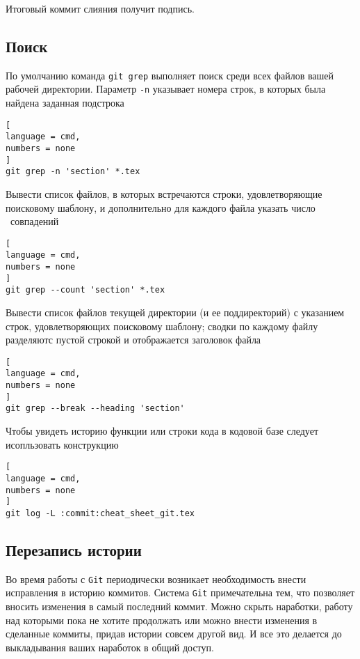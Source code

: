 \documentclass[%
	11pt,
	a4paper,
	utf8,
		]{article}
\begin{document}
Итоговый коммит слияния получит подпись.


\subsection{Поиск}

По умолчанию команда \texttt{git grep} выполняет поиск среди всех файлов вашей рабочей директории. Параметр \texttt{-n} указывает номера строк, в которых была найдена заданная подстрока

\begin{lstlisting}[
language = cmd,
numbers = none
]
git grep -n 'section' *.tex
\end{lstlisting}

Вывести список файлов, в которых встречаются строки, удовлетворяющие поисковому шаблону, и дополнительно для каждого файла указать число  совпадений

\begin{lstlisting}[
language = cmd,
numbers = none
]
git grep --count 'section' *.tex
\end{lstlisting}

Вывести список файлов текущей директории (и ее поддиректорий) с указанием строк, удовлетворяющих поисковому шаблону; сводки по каждому файлу разделяютс пустой строкой и отображается заголовок файла

\begin{lstlisting}[
language = cmd,
numbers = none
]
git grep --break --heading 'section'
\end{lstlisting}

Чтобы увидеть историю функции или строки кода в кодовой базе следует исопльзовать конструкцию

\begin{lstlisting}[
language = cmd,
numbers = none
]
git log -L :commit:cheat_sheet_git.tex
\end{lstlisting}

\subsection{Перезапись истории}

Во время работы с \texttt{Git} периодически возникает необходимость внести исправления в историю коммитов. Система \texttt{Git} примечательна тем, что позволяет вносить изменения в самый последний коммит. Можно скрыть наработки, работу над которыми пока не хотите продолжать или можно внести изменения в сделанные коммиты, придав истории совсем другой вид. И все это делается до выкладывания ваших наработок в общий доступ.
\end{document}
